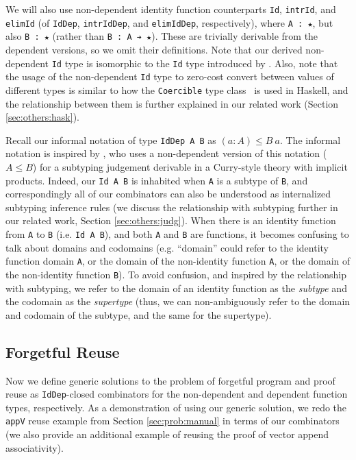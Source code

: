 \documentclass[acmsmall,screen]{acmart}
\newcommand{\refsec}[1]{Section \ref{sec:#1}}
\newcommand{\labsec}[1]{\label{sec:#1}}
\begin{document}
We will also use non-dependent identity function counterparts
\verb;Id;, \verb;intrId;, and \verb;elimId;
(of \verb;IdDep;, \verb;intrIdDep;, and \verb;elimIdDep;, respectively),
where \verb;A : ★;, but also \verb;B : ★; (rather than \verb;B : A ➔ ★;).
These are trivially derivable from the dependent versions, so we
omit their definitions. Note that our derived non-dependent \verb;Id;
type is isomorphic to the \verb;Id; type introduced by
\citet{firsov18b}. Also, note that the usage of the non-dependent
\verb;Id; type to zero-cost convert between values of different types
is similar to how the \verb;Coercible; type class~\cite{breitner+16}
is used in Haskell, and the relationship between them is further
explained in our related work (\refsec{others:hask}).

Recall our informal notation of type
\verb;IdDep A B; as $(a : A) \leq B~a$.
The informal notation is
inspired by \citet{miquel01}, who uses a non-dependent version
of this notation ($A \leq B$) for a
subtyping judgement derivable in a Curry-style theory with implicit
products. Indeed, our \verb;Id A B; is inhabited when
\verb;A; is a subtype of \verb;B;, and correspondingly all of
our combinators can also be understood as internalized subtyping
inference rules (we discuss the relationship with subtyping further in
our related work, \refsec{others:judg}).
When there is an identity function
from \verb;A; to \verb;B; (i.e. \verb;Id A B;), and both
\verb;A; and \verb;B; are functions, it becomes confusing to talk
about domains and codomains (e.g. ``domain'' could refer to the
identity function domain \verb;A;, or the
domain of the non-identity function \verb;A;,
or the domain of the non-identity function \verb;B;). To avoid confusion,
and inspired by the relationship with subtyping, we refer to the
domain of an identity function as the \textit{subtype} and the
codomain as the \textit{supertype} (thus, we can non-ambiguously refer
to the domain and codomain of the subtype, and the same for the supertype).

\subsection{Forgetful Reuse}
\labsec{prog:fog}

Now we define generic solutions to the problem of
forgetful program and proof reuse as \verb;IdDep;-closed
combinators for the non-dependent and dependent function types,
respectively. As a demonstration of using our generic solution,
we redo the \verb;appV; reuse example from \refsec{prob:manual} in
terms of our combinators (we also provide an additional example of
reusing the proof of vector append associativity).
\end{document}
